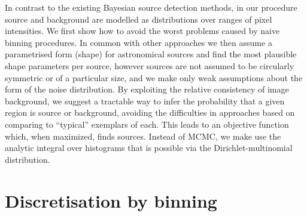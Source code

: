 \documentclass[
    ,final            %
  ]
  {aipproc}
\begin{document}
In contrast to the existing Bayesian source detection methods, in our procedure source and background are modelled as distributions over ranges of pixel intensities. We first show how to avoid the worst problems caused by naive binning procedures. In common with other approaches we then assume a parametrised form (shape) for astronomical sources and find the most plausible shape parameters per source, however sources are not assumed to be circularly symmetric or of a particular size, and we make only weak assumptions about the form of the noise distribution. By exploiting the relative consistency of image background, we suggest a tractable way to infer the probability that a given region is source or background, avoiding the difficulties in approaches based on comparing to ``typical'' exemplars of each. This leads to an objective function which, when maximized, finds sources. Instead of MCMC, we make use the analytic integral over histograms that is possible via the Dirichlet-multinomial distribution.




\section{Discretisation by binning}\label{sec:binning-strategies}
\end{document}
